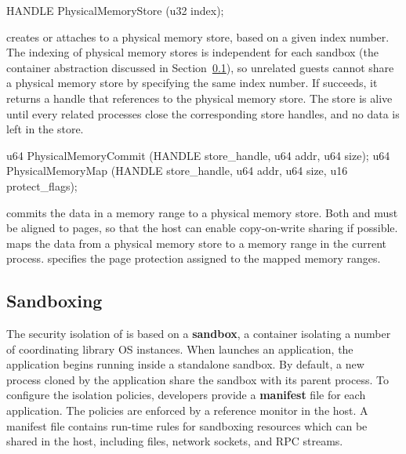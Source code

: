 \begin{paldef}
HANDLE PhysicalMemoryStore  (u32 index);
\end{paldef}


 creates or attaches to a physical memory store,
based on a given index number.
The indexing of physical memory stores is independent for each sandbox (the container abstraction discussed in Section~\ref{sec:abi:proc:sandbox}),
so unrelated guests cannot share a physical memory store by specifying the same index number.
If  succeeds,
it returns a handle that references to the physical memory store.
The store is alive until every related processes close the corresponding store handles,
and no data is left in the store.




\begin{paldef}
u64    PhysicalMemoryCommit (HANDLE store_handle,
                             u64 addr, u64 size);
u64    PhysicalMemoryMap    (HANDLE store_handle,
                             u64 addr, u64 size,
                             u16 protect_flags);
\end{paldef}


 commits the data in a memory range to a physical memory store.
Both  and  must be aligned to pages,
so that the host can enable copy-on-write sharing if possible.
 maps the data from a physical memory store
to a memory range in the current process.
 specifies the page protection assigned to the mapped memory ranges.




\subsection{Sandboxing}
\label{sec:abi:proc:sandbox}


The security isolation of \graphene{} is based on a {\bf sandbox}, a container isolating a number of coordinating library OS instances.
When \graphene{} launches an application, the application begins running inside a standalone sandbox.
By default, a new process cloned by the application share the sandbox
with its parent process.
To configure the isolation policies,
developers provide a {\bf manifest} file for each application.
The policies are enforced by a reference monitor in the host.
A manifest file contains run-time rules for sandboxing resources which can be shared in the host,
including files, network sockets, and RPC streams.



